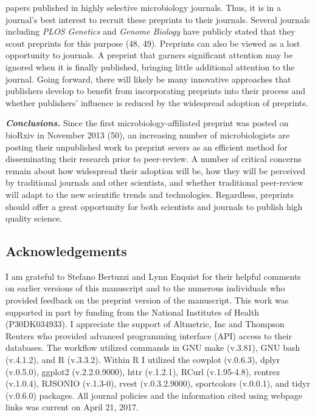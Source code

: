 \documentclass[11pt,]{article}
\begin{document}
papers published in highly selective microbiology journals. Thus, it is
in a journal's best interest to recruit these preprints to their
journals. Several journals including \emph{PLOS Genetics} and
\emph{Genome Biology} have publicly stated that they scout preprints for
this purpose (48, 49). Preprints can also be viewed as a lost
opportunity to journals. A preprint that garners significant attention
may be ignored when it is finally published, bringing little additional
attention to the journal. Going forward, there will likely be many
innovative approaches that publishers develop to benefit from
incorporating preprints into their process and whether publishers'
influence is reduced by the widespread adoption of preprints.

\textbf{\emph{Conclusions.}} Since the first microbiology-affiliated
preprint was posted on bioRxiv in November 2013 (50), an increasing
number of microbiologists are posting their unpublished work to preprint
severs as an efficient method for disseminating their research prior to
peer-review. A number of critical concerns remain about how widespread
their adoption will be, how they will be perceived by traditional
journals and other scientists, and whether traditional peer-review will
adapt to the new scientific trends and technologies. Regardless,
preprints should offer a great opportunity for both scientists and
journals to publish high quality science.

\subsection{Acknowledgements}\label{acknowledgements}

I am grateful to Stefano Bertuzzi and Lynn Enquist for their helpful
comments on earlier versions of this manuscript and to the numerous
individuals who provided feedback on the preprint version of the
manuscript. This work was supported in part by funding from the National
Institutes of Health (P30DK034933). I appreciate the support of
Altmetric, Inc and Thompson Reuters who provided advanced programming
interface (API) access to their databases. The workflow utilized
commands in GNU make (v.3.81), GNU bash (v.4.1.2), and R (v.3.3.2).
Within R I utilized the cowplot (v.0.6.3), dplyr (v.0.5.0), ggplot2
(v.2.2.0.9000), httr (v.1.2.1), RCurl (v.1.95-4.8), rentrez (v.1.0.4),
RJSONIO (v.1.3-0), rvest (v.0.3.2.9000), sportcolors (v.0.0.1), and
tidyr (v.0.6.0) packages. All journal policies and the information cited
using webpage links was current on April 21, 2017.
\end{document}
